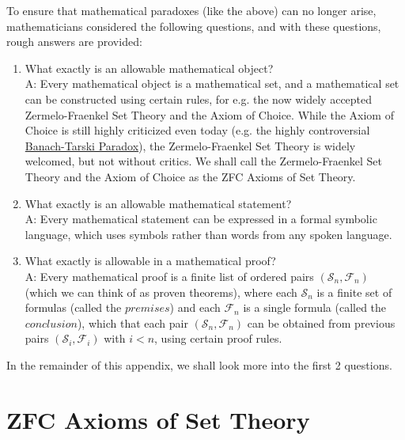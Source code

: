 \documentclass[11pt, oneside]{book}
\theoremstyle{break}
\begin{document}
To ensure that mathematical paradoxes (like the above) can no longer arise, mathematicians considered the following questions, and with these questions, rough answers are provided:
\begin{enumerate}
	\item What exactly is an allowable mathematical object? \\
	A: Every mathematical object is a mathematical set, and a mathematical set can be constructed using certain rules, for e.g. the now widely accepted Zermelo-Fraenkel Set Theory and the Axiom of Choice. While the Axiom of Choice is still highly criticized even today (e.g. the highly controversial \href{https://en.wikipedia.org/wiki/Banach–Tarski_paradox}{Banach-Tarski Paradox}), the Zermelo-Fraenkel Set Theory is widely welcomed, but not without critics. We shall call the Zermelo-Fraenkel Set Theory and the Axiom of Choice as the ZFC Axioms of Set Theory.
	\item What exactly is an allowable mathematical statement? \\
	A: Every mathematical statement can be expressed in a formal symbolic language, which uses symbols rather than words from any spoken language.
	\item What exactly is allowable in a mathematical proof? \\
	A: Every mathematical proof is a finite list of ordered pairs $(\mathscr{S}_n, \mathscr{F}_n)$ (which we can think of as proven theorems), where each $\mathscr{S}_n$ is a finite set of formulas (called the $\textit{premises}$) and each $\mathscr{F}_n$ is a single formula (called the $\textit{conclusion}$), which that each pair $(\mathscr{S}_n, \mathscr{F}_n)$ can be obtained from previous pairs $(\mathscr{S}_i, \mathscr{F}_i)$ with $i < n$, using certain proof rules.
\end{enumerate}

In the remainder of this appendix, we shall look more into the first 2 questions.


\section{ZFC Axioms of Set Theory}
\end{document}
